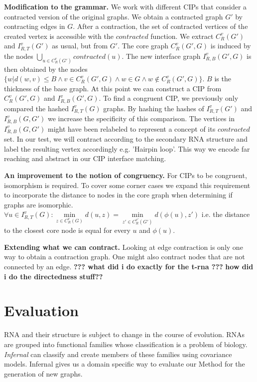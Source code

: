 \documentclass{article}
\begin{document}
\textbf{Modification to the grammar.}
We work with different CIPs that consider a contracted version
of the original graphs. We obtain a contracted graph $G'$ by contracting edges
in $G$. After a contraction, the set of contracted vertices of the 
created vertex is accessible with the $contracted$ function.
We extract $C_{R}^v(G')$ and $I_{R,T}^v(G')$ as usual, but from $G'$. 
The core graph $C_{R}^v(G',G)$ is induced by the nodes 
$\bigcup\limits_{u \in C_R^v(G')} contracted(u)$.
The new interface graph $I_{R,B}^v(G',G)$ is then obtained by the nodes 
$\{ w | d(w,v) \leq B \wedge v\in C_R^v(G',G) \wedge w \in G \wedge w 
\notin C_R^v(G',G) \}$.  $B$ is the thickness of the base graph. 
At this point we can construct a CIP from $C_R^v(G',G)$ and $I_{R,B}^v(G',G)$. 
To find a congruent CIP, we previously only compared the hashed $I_{R,T}^v(G)$ 
graphs. By hashing the hashes of $I_{R,T}^v(G')$ and $I_{R,B}^v(G,G')$ we 
increase the specificity of this comparison. The vertices in $I_{R,B}^v(G,G')$ 
might have been relabeled to represent a concept of its $contracted$ set. In 
our test, we will contract according to the 
secondary RNA structure and label the resulting vertex accordingly e.g.
'Hairpin loop'. This way we encode 
far reaching and abstract in our CIP interface matching.



\textbf{An improvement to the notion of congruency.}
For CIPs to be congruent, isomorphism is required. 
To cover some corner cases we expand this requirement to incorporate
the distance to nodes in the core graph when determining if graphs are 
isomorphic.
$\forall u \in I_{R,T}^v(G) : 
\underset{z \in  C_{R}^v(G)}{\min} d(u,z) = 
\underset{z' \in  C_{R}^{v'}(G')}{\min} d(\phi(u),z') $ i.e. the distance 
to the closest core node is equal for every
$u$ and $\phi(u)$.

\textbf{Extending what we can contract.}
Looking at edge contraction is only one way to obtain a contraction graph. 
One might also contract nodes that are not connected by an edge.
\textbf{??? what did i do exactly for the t-rna ???}
\textbf{how did i do the directedness stuff??}




\section{Evaluation}
RNA and their structure is subject to change in the course of evolution.
RNAs are grouped into functional families whose classification
is a problem of biology. \emph{Infernal} can classify and 
create members of these families using covariance models.
Infernal gives us a domain specific way to evaluate
our Method for the generation of new graphs. 
\end{document}

